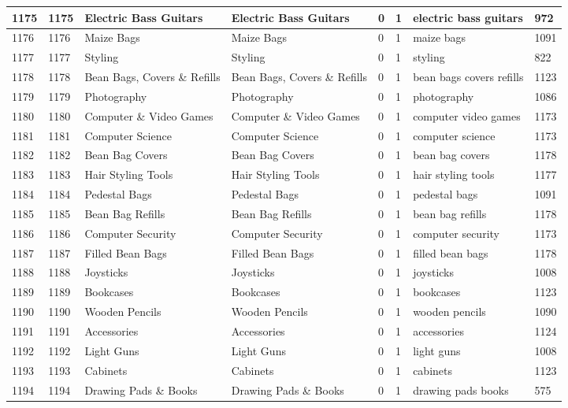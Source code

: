 \begin{longtable}{|l|l|l|l|l|l|l|l|}
1175 & 1175 & Electric Bass Guitars & Electric Bass Guitars & 0 & 1 & electric bass guitars & 972 \\ \hline 
1176 & 1176 & Maize Bags & Maize Bags & 0 & 1 & maize bags & 1091 \\ \hline 
1177 & 1177 & Styling & Styling & 0 & 1 & styling & 822 \\ \hline 
1178 & 1178 & Bean Bags, Covers \& Refills & Bean Bags, Covers \& Refills & 0 & 1 & bean bags covers refills & 1123 \\ \hline 
1179 & 1179 & Photography & Photography & 0 & 1 & photography & 1086 \\ \hline 
1180 & 1180 & Computer \& Video Games & Computer \& Video Games & 0 & 1 & computer video games & 1173 \\ \hline 
1181 & 1181 & Computer Science & Computer Science & 0 & 1 & computer science & 1173 \\ \hline 
1182 & 1182 & Bean Bag Covers & Bean Bag Covers & 0 & 1 & bean bag covers & 1178 \\ \hline 
1183 & 1183 & Hair Styling Tools & Hair Styling Tools & 0 & 1 & hair styling tools & 1177 \\ \hline 
1184 & 1184 & Pedestal Bags & Pedestal Bags & 0 & 1 & pedestal bags & 1091 \\ \hline 
1185 & 1185 & Bean Bag Refills & Bean Bag Refills & 0 & 1 & bean bag refills & 1178 \\ \hline 
1186 & 1186 & Computer Security & Computer Security & 0 & 1 & computer security & 1173 \\ \hline 
1187 & 1187 & Filled Bean Bags & Filled Bean Bags & 0 & 1 & filled bean bags & 1178 \\ \hline 
1188 & 1188 & Joysticks & Joysticks & 0 & 1 & joysticks & 1008 \\ \hline 
1189 & 1189 & Bookcases & Bookcases & 0 & 1 & bookcases & 1123 \\ \hline 
1190 & 1190 & Wooden Pencils & Wooden Pencils & 0 & 1 & wooden pencils & 1090 \\ \hline 
1191 & 1191 & Accessories & Accessories & 0 & 1 & accessories & 1124 \\ \hline 
1192 & 1192 & Light Guns & Light Guns & 0 & 1 & light guns & 1008 \\ \hline 
1193 & 1193 & Cabinets & Cabinets & 0 & 1 & cabinets & 1123 \\ \hline 
1194 & 1194 & Drawing Pads \& Books & Drawing Pads \& Books & 0 & 1 & drawing pads books & 575 \\ \hline 

\end{longtable}
